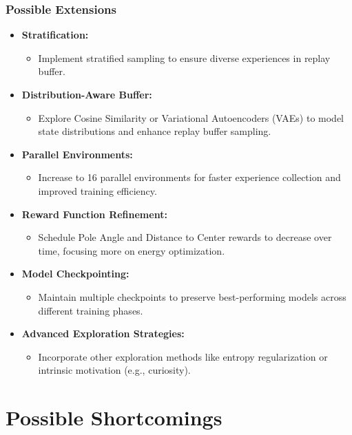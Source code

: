 \documentclass{beamer}
\begin{document}
\begin{frame}
\frametitle{Possible Extensions}
\begin{itemize}
    \item \textbf{Stratification:} 
    \begin{itemize}
        \item Implement stratified sampling to ensure diverse experiences in replay buffer.
    \end{itemize}
    \item \textbf{Distribution-Aware Buffer:}
    \begin{itemize}
        \item Explore Cosine Similarity or Variational Autoencoders (VAEs) to model state distributions and enhance replay buffer sampling.
    \end{itemize}
    \item \textbf{Parallel Environments:}
    \begin{itemize}
        \item Increase to 16 parallel environments for faster experience collection and improved training efficiency.
    \end{itemize}
    \item \textbf{Reward Function Refinement:}
    \begin{itemize}
        \item Schedule Pole Angle and Distance to Center rewards to decrease over time, focusing more on energy optimization.
    \end{itemize}
    \item \textbf{Model Checkpointing:}
    \begin{itemize}
        \item Maintain multiple checkpoints to preserve best-performing models across different training phases.
    \end{itemize}
    \item \textbf{Advanced Exploration Strategies:}
    \begin{itemize}
        \item Incorporate other exploration methods like entropy regularization or intrinsic motivation (e.g., curiosity).
    \end{itemize}
\end{itemize}
\end{frame}

\section{Possible Shortcomings}
\end{document}
